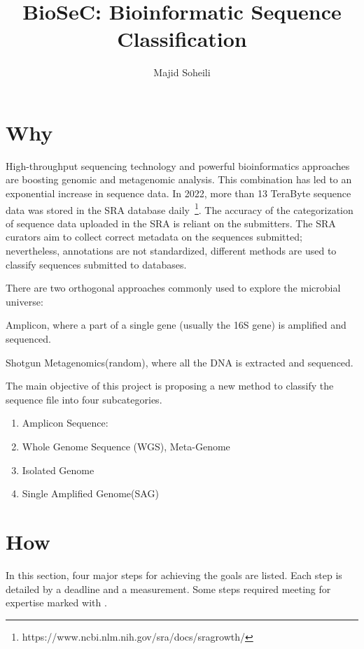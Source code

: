 \documentclass[a4paper]{article}
\newcommand{\remeet}{{\color{red} \dag}}
\begin{document}
    \title{BioSeC: Bioinformatic Sequence Classification}
    \author{Majid Soheili}
    \maketitle

    \section{Why}\label{sec:why}
    High-throughput sequencing technology and powerful bioinformatics approaches are boosting genomic and metagenomic analysis.
    This combination has led to an exponential increase in sequence data.
    In 2022, more than 13 TeraByte sequence data was stored in the SRA database daily~\footnote{https://www.ncbi.nlm.nih.gov/sra/docs/sragrowth/}.
    The accuracy of the categorization of sequence data uploaded in the SRA is reliant on the submitters.
    The SRA curators aim to collect correct metadata on the sequences submitted;
    nevertheless, annotations are not standardized, different methods are used to classify sequences submitted to databases.

    There are two orthogonal approaches commonly used to explore the microbial universe:
    \begin{enumerate*}[label=(\roman*)]
        \item Amplicon, where a part of a single gene (usually the 16S gene) is amplified and sequenced.
        \item Shotgun Metagenomics(random), where all the DNA is extracted and sequenced.
    \end{enumerate*}
    The main objective of this project is proposing a new method to classify the sequence file into four subcategories.
    \begin{enumerate}
        \item Amplicon Sequence:
        \item Whole Genome Sequence (WGS), Meta-Genome
        \item Isolated Genome
        \item Single Amplified Genome(SAG)
    \end{enumerate}

    \section{How}\label{sec:how}
    In this section, four major steps for achieving the goals are listed.
    Each step is detailed by a deadline and a measurement.
    Some steps required meeting for expertise marked with \remeet.
\end{document}
